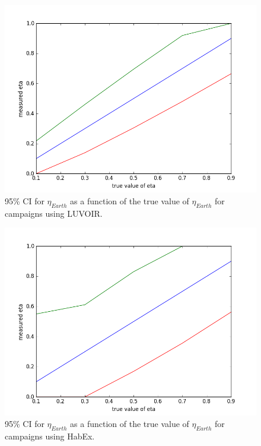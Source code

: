 \documentclass{article}
\begin{document}
	\begin{figure}
		\includegraphics[width = \linewidth]{LUVOIR_eta_earth_constraints.png}
		\caption{95\% CI for $\eta_{Earth}$ as a function of the true value of $\eta_{Earth}$ for campaigns using LUVOIR.}
		\label{fig:LUVOIR_eta_constraints}
	\end{figure}
	
	\begin{figure}
		\includegraphics[width = \linewidth]{HABEX_eta_earth_constraints.png}
		\caption{95\% CI for $\eta_{Earth}$ as a function of the true value of $\eta_{Earth}$ for campaigns using HabEx.}
		\label{fig:HABEX_eta_constraints}
	\end{figure}
	
\end{document}

